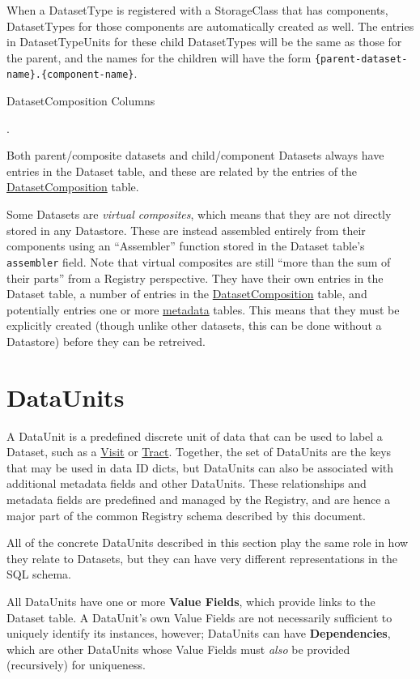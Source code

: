 \documentclass[DM,toc]{lsstdoc}
\newcommand{\tblref}[1]{\hyperref[tbl:#1]{#1}}
\newcommand{\unitref}[1]{\hyperref[unit:#1]{#1}}
\newcommand{\coltable}[1]{
    \begin{table}[htb]
        {
            \footnotesize
            
        }
        \caption{#1 Columns}
        \label{tbl:#1}
    \end{table}
}
\begin{document}
When a DatasetType is registered with a StorageClass that has components, DatasetTypes for those components are automatically created as well.
The entries in DatasetTypeUnits for these child DatasetTypes will be the same as those for the parent, and the names for the children will have the form \texttt{\{parent-dataset-name\}.\{component-name\}}.

\coltable{DatasetComposition}.

Both parent/composite datasets and child/component Datasets always have entries in the Dataset table, and these are related by the entries of the \tblref{DatasetComposition} table.

Some Datasets are \emph{virtual composites}, which means that they are not
directly stored in any Datastore.
These are instead assembled entirely from their components using an ``Assembler'' function stored in the Dataset table's \texttt{assembler} field.
Note that virtual composites are still ``more than the sum of their parts'' from a Registry perspective.
They have their own entries in the Dataset table, a number of entries in the \tblref{DatasetComposition} table, and potentially entries one or more \hyperref[sec:metadata]{metadata} tables.
This means that they must be explicitly created (though unlike other datasets, this can be done without a Datastore) before they can be retreived.

\section{DataUnits}
\label{sec:dataunits}

A DataUnit is a predefined discrete unit of data that can be used to label a Dataset, such as a \unitref{Visit} or \unitref{Tract}.
Together, the set of DataUnits are the keys that may be used in data ID dicts, but DataUnits can also be associated with additional metadata fields and other DataUnits.
These relationships and metadata fields are predefined and managed by the Registry, and are hence a major part of the common Registry schema described by this document.

All of the concrete DataUnits described in this section play the same role in how they relate to Datasets, but they can have very different representations in the SQL schema.

All DataUnits have one or more \textbf{Value Fields}, which provide links to the Dataset table.
A DataUnit's own Value Fields are not necessarily sufficient to uniquely identify its instances, however; DataUnits can have \textbf{Dependencies}, which are other DataUnits whose Value Fields must \emph{also} be provided (recursively) for uniqueness.
\end{document}
